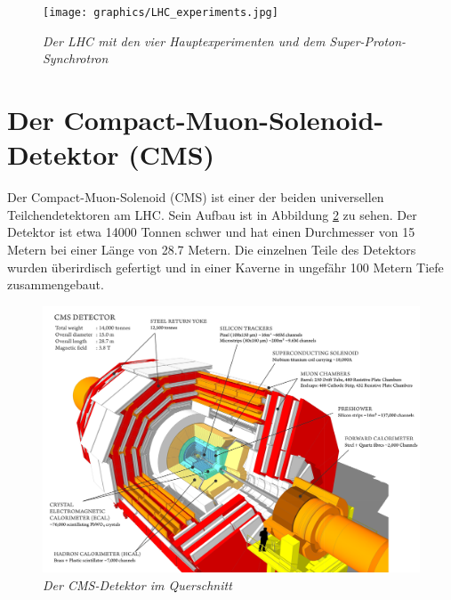 \begin{figure}[hhh]
 \begin{center}
   \texttt{[image: graphics/LHC\_experiments.jpg]}
   \parbox[b]{12cm}{
     \caption[Large-Hadron-Collider]
             {\label{fig:LHC} \it\!Der LHC mit den vier Hauptexperimenten und dem Super-Proton-Synchrotron \cite{Team:40525}}
   }
 \end{center}
\end{figure}

\section{Der Compact-Muon-Solenoid-Detektor (CMS)}
\label{ch:Experiment:sec:CMS}

Der Compact-Muon-Solenoid (CMS) ist einer der beiden universellen Teilchendetektoren am LHC. Sein Aufbau ist in Abbildung \ref{fig:cms_sectional} zu sehen. Der Detektor ist etwa \num{14000} Tonnen schwer und hat einen Durchmesser von \num{15} Metern bei einer L\"ange von \num{28,7} Metern. Die einzelnen Teile des Detektors wurden \"uberirdisch gefertigt und in einer Kaverne in ungef\"ahr \num{100} Metern Tiefe zusammengebaut.
\begin{figure}[hhh]
 \begin{center}
   \includegraphics[width=\textwidth]{graphics/cms_sectional.png}
   \parbox[b]{12cm}{
     \caption[CMS-Detektor]
             {\label{fig:cms_sectional} \it\!Der CMS-Detektor im Querschnitt \cite{cms_sectional}}
   }
 \end{center}
\end{figure}

